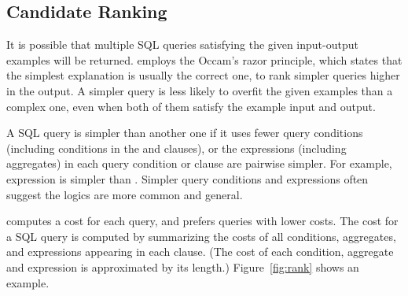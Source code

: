 \subsection{Candidate Ranking}
\label{sec:ranking}

\vspace{-1mm}

It is possible that multiple SQL queries satisfying
the given input-output examples will be returned.
\ourtool employs the Occam's razor principle,
which states that the simplest explanation is
usually the correct one, to rank simpler queries higher in
the output.
A simpler query is less likely to overfit the given examples
than a complex one, even when both of them
satisfy the example input and output.


A SQL query is simpler than another one if it uses
fewer query conditions (including conditions in the 
and  clauses), or the expressions (including
aggregates) in each query condition or clause are pairwise simpler.
For example, expression  is simpler than
.
Simpler query conditions and expressions often suggest the
logics are more common and general.

\ourtool computes a cost for each
query, and prefers queries with lower costs. The cost
for a SQL query is computed by summarizing
the costs of all conditions, aggregates,
and expressions
appearing in each clause. %
(The cost of each condition, aggregate and expression
is approximated by its length.)
Figure~\ref{fig:rank} shows an example.


